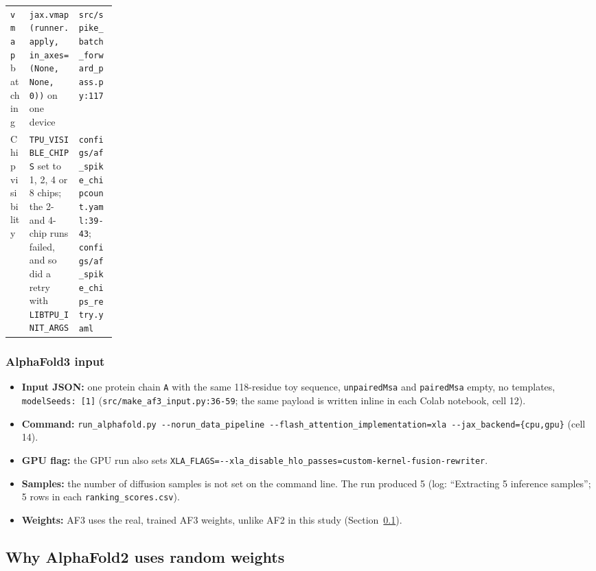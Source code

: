 \begin{center}
\begin{tabularx}{\linewidth}{>{\raggedright\arraybackslash}p{0.18\linewidth}>{\raggedright\arraybackslash}X>{\raggedright\arraybackslash}X}
\texttt{vmap} batching & \texttt{jax.vmap(runner.apply, in\_\allowbreak{}axes=(None, None, 0))} on one device & \texttt{src/\allowbreak{}spike\_\allowbreak{}batch\_\allowbreak{}forward\_\allowbreak{}pass.py:117} \\
Chip visibility & \texttt{TPU\_VISIBLE\_CHIPS} set to 1, 2, 4 or 8 chips; the 2- and 4-chip runs failed, and so did a retry with \texttt{LIBTPU\_INIT\_ARGS} & \texttt{configs/\allowbreak{}af\_\allowbreak{}spike\_\allowbreak{}chipcount.yaml:39-43}; \texttt{configs/\allowbreak{}af\_\allowbreak{}spike\_\allowbreak{}chips\_\allowbreak{}retry.yaml} \\
\bottomrule
\end{tabularx}
\end{center}

\subsubsection{AlphaFold3 input}
\label{sec:meth-af3-input}

\begin{itemize}
  \item \textbf{Input JSON:} one protein chain \texttt{A} with the same 118-residue toy sequence,
    \texttt{unpairedMsa} and \texttt{pairedMsa} empty, no templates, \texttt{modelSeeds: [1]}
    (\texttt{src/\allowbreak{}make\_\allowbreak{}af3\_\allowbreak{}input.py:36-59}; the same payload is written inline in each
    Colab notebook, cell 12).
  \item \textbf{Command:} \texttt{run\_alphafold.py -{}-norun\_data\_pipeline
    -{}-flash\_attention\_implementation=xla -{}-jax\_backend=\{cpu,gpu\}} (cell 14).
  \item \textbf{GPU flag:} the GPU run also sets
    \texttt{XLA\_\allowbreak{}FLAGS=-{}-xla\_\allowbreak{}disable\_\allowbreak{}hlo\_\allowbreak{}passes=custom-kernel-fusion-rewriter}.
  \item \textbf{Samples:} the number of diffusion samples is not set on the command line.
    The run produced 5 (log: ``Extracting 5 inference samples''; 5 rows in each
    \texttt{ranking\_scores.csv}).
  \item \textbf{Weights:} AF3 uses the real, trained AF3 weights, unlike AF2 in this study
    (Section~\ref{sec:meth-random-weights}).
\end{itemize}

\subsection{Why AlphaFold2 uses random weights}
\label{sec:meth-random-weights}

